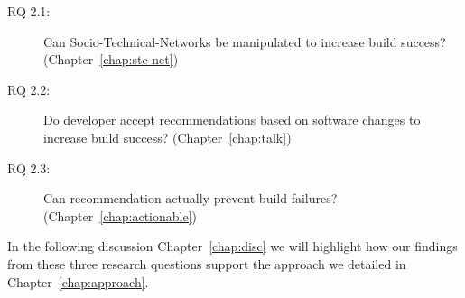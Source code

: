 \begin{description}
  \item[RQ 2.1:] Can Socio-Technical-Networks be manipulated to increase build success? (Chapter~\ref{chap:stc-net})
  \item[RQ 2.2:] Do developer accept recommendations based on software changes to increase build success? (Chapter~\ref{chap:talk})
  \item[RQ 2.3:] Can recommendation actually prevent build failures? (Chapter~\ref{chap:actionable})
\end{description}

In the following discussion Chapter~\ref{chap:disc} we will highlight how our findings from these three research questions support the approach we detailed in Chapter~\ref{chap:approach}.









